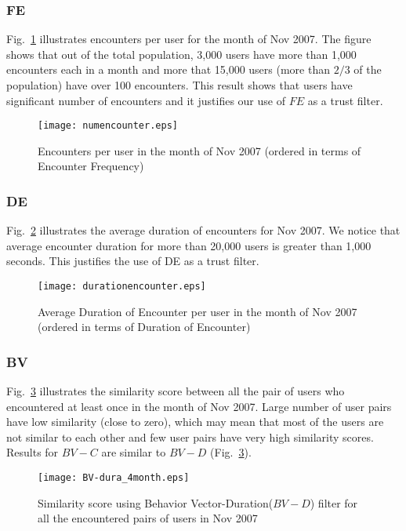 \documentclass[10pt,conference]{IEEEtran}
\begin{document}
\subsubsection{FE}
Fig.~\ref{fig:FE}  illustrates encounters per user for the month of Nov 2007. The figure shows that out of the total population, 3,000 users have more than 1,000 encounters each in a month and more that 15,000 users (more than $2/3$ of the population) have over 100 encounters. This result shows that users have significant number of encounters and it justifies our use of $FE$ as a trust filter.  
\begin{figure}
\centering

\texttt{[image: numencounter.eps]} 
\caption{Encounters per user in the month of Nov 2007 (ordered in terms of Encounter Frequency)}
\label{fig:FE}
\end{figure}



\subsubsection{DE}
Fig.~\ref{fig:DE} illustrates the average duration of encounters for Nov 2007. We notice that average encounter duration for more than 20,000 users is greater than 1,000 seconds. This justifies the use of DE as a trust filter.

\begin{figure}
\centering

\texttt{[image: durationencounter.eps]} 
\caption{Average Duration of Encounter per user in the month of Nov 2007 (ordered in terms of Duration of Encounter)}
\label{fig:DE}
\end{figure}

\subsubsection{BV}
 Fig.~\ref{fig:BV-dura} illustrates the similarity score between all the pair of users who encountered at least once in the month of Nov 2007. Large number of user pairs have low similarity (close to zero), which may mean that most of the users are not similar to each other and few user pairs have very high similarity scores. Results for $BV-C$ are similar to $BV-D$ (Fig.~\ref{fig:BV-dura}).


\begin{figure}
\centering
\texttt{[image: BV-dura\_4month.eps]} 
\caption{Similarity score using Behavior Vector-Duration($BV-D$) filter for all the encountered pairs of users in Nov 2007 }
\label{fig:BV-dura}
\end{figure}
\end{document}
